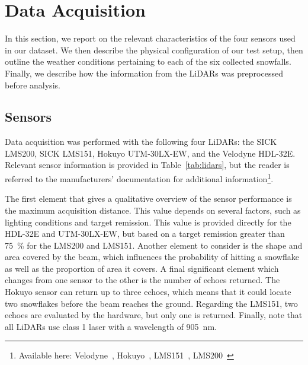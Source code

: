 \section{Data Acquisition}
\label{sec:chap_lidar_data_acquisition}

In this section, we report on the relevant characteristics of the four sensors used in our dataset. We then describe the physical configuration of our test setup, then outline the weather conditions pertaining to each of the six collected snowfalls. Finally, we describe how the information from the LiDARs was preprocessed before analysis.

\subsection{Sensors}

Data acquisition was performed with the following four LiDARs: the SICK LMS200, SICK LMS151, Hokuyo UTM-30LX-EW, and the Velodyne HDL-32E. Relevant sensor information is provided in Table~\ref{tab:lidars}, but the reader is referred to the manufacturers' documentation for additional information\footnote{Available here: Velodyne~\citep{VelodyneManual}, Hokuyo~\citep{UTMDatasheet}, LMS151~\citep{LMS151Datasheet}, LMS200~\citep{LMS200Manual}}.

The first element that gives a qualitative overview of the sensor performance is the maximum acquisition distance. This value depends on several factors, such as lighting conditions and target remission. This value is provided directly for the HDL-32E and UTM-30LX-EW, but based on a target remission greater than \SI{75}{\percent} for the LMS200 and LMS151. Another element to consider is the shape and area covered by the beam, which influences the probability of hitting a snowflake as well as the proportion of area it covers. A final significant element which changes from one sensor to the other is the number of echoes returned. The Hokuyo sensor can return up to three echoes, which means that it could locate two snowflakes before the beam reaches the ground. Regarding the LMS151, two echoes are evaluated by the hardware, but only one is returned. Finally, note that all LiDARs use class 1 laser with a wavelength of \SI{905}{\nano\meter}.

